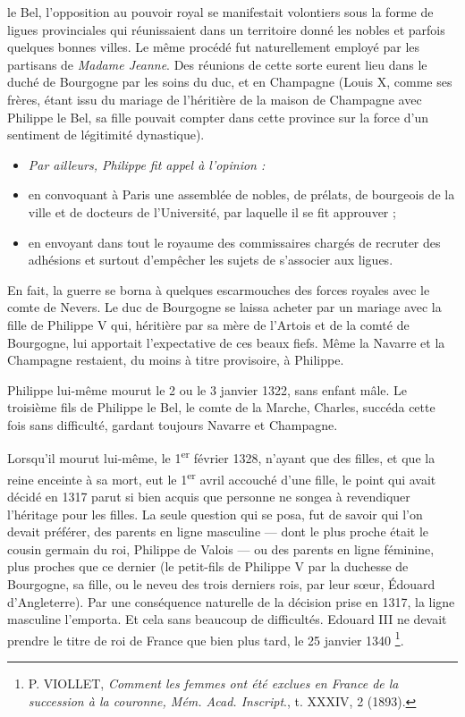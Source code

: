 \documentclass[french,twoside]{book} %
\newlength{\listmod}
\newcommand{\listhead}[1]{\hspace{-1\listmod}\emph{#1}}
\begin{document}
\label{p13} le Bel, l’opposition au pouvoir royal se manifestait volontiers sous la forme de ligues provinciales qui réunissaient dans un territoire donné les nobles et parfois quelques bonnes villes. Le même procédé fut naturellement employé par les partisans de \emph{Madame Jeanne}. Des réunions de cette sorte eurent lieu dans le duché de Bourgogne par les soins du duc, et en Champagne (Louis X, comme ses frères, étant issu du mariage de l’héritière de la maison de Champagne avec Philippe le Bel, sa fille pouvait compter dans cette province sur la force d’un sentiment de légitimité dynastique).\par

\begin{itemize}[itemsep=0pt,]
\item[]\listhead{Par ailleurs, Philippe fit appel à l’opinion :}
\item en convoquant à Paris une assemblée de nobles, de prélats, de bourgeois de la ville et de docteurs de l’Université, par laquelle il se fit approuver ;
\item en envoyant dans tout le royaume des commissaires chargés de recruter des adhésions et surtout d’empêcher les sujets de s’associer aux ligues.
\end{itemize}
\noindent En fait, la guerre se borna à quelques escarmouches des forces royales avec le comte de Nevers. Le duc de Bourgogne se laissa acheter par un mariage avec la fille de Philippe V qui, héritière par sa mère de l’Artois et de la comté de Bourgogne, lui apportait l’expectative de ces beaux fiefs. Même la Navarre et la Champagne restaient, du moins à titre provisoire, à Philippe.\par
Philippe lui-même mourut le 2 ou le 3 janvier 1322, sans enfant mâle. Le troisième fils de Philippe le Bel, le comte de la Marche, Charles, succéda cette fois sans difficulté, gardant toujours Navarre et Champagne.\par
Lorsqu’il mourut lui-même, le 1\textsuperscript{er} février 1328, n’ayant que des filles, et que la reine enceinte à sa mort, eut le 1­\textsuperscript{er} avril accouché d’une fille, le point qui avait décidé en 1317 parut si bien acquis que personne ne songea à revendiquer l’héritage pour les filles. La seule question qui se posa, fut de savoir qui l’on devait préférer, des parents en ligne masculine — dont le plus proche était le cousin germain du roi, Philippe de Valois — ou des parents en ligne féminine, plus proches que ce dernier (le petit-fils de Philippe V par la duchesse de Bourgogne, sa fille, ou le neveu des trois derniers rois, par leur sœur, Édouard d’Angleterre). Par une conséquence naturelle de la décision prise en 1317, la ligne masculine l’emporta. Et cela sans beaucoup de difficultés. Edouard III ne devait prendre le titre de roi de France que bien plus tard, le 25 janvier 1340 \footnote{ P. VIOLLET, {\itshape Comment les femmes ont été exclues en France de la succession à la couronne, Mém. Acad. Inscript}., t. XXXIV, 2 (1893).}.\par
\end{document}
